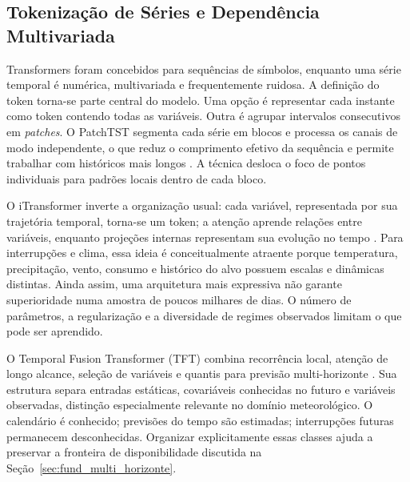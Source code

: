 \subsection{Tokenização de Séries e Dependência Multivariada}

Transformers foram concebidos para sequências de símbolos, enquanto uma série temporal é numérica, multivariada e frequentemente ruidosa. A definição do token torna-se parte central do modelo. Uma opção é representar cada instante como token contendo todas as variáveis. Outra é agrupar intervalos consecutivos em \textit{patches}. O PatchTST segmenta cada série em blocos e processa os canais de modo independente, o que reduz o comprimento efetivo da sequência e permite trabalhar com históricos mais longos \cite{nie2023patchtst}. A técnica desloca o foco de pontos individuais para padrões locais dentro de cada bloco.

O iTransformer inverte a organização usual: cada variável, representada por sua trajetória temporal, torna-se um token; a atenção aprende relações entre variáveis, enquanto projeções internas representam sua evolução no tempo \cite{liu2024itransformer}. Para interrupções e clima, essa ideia é conceitualmente atraente porque temperatura, precipitação, vento, consumo e histórico do alvo possuem escalas e dinâmicas distintas. Ainda assim, uma arquitetura mais expressiva não garante superioridade numa amostra de poucos milhares de dias. O número de parâmetros, a regularização e a diversidade de regimes observados limitam o que pode ser aprendido.

O Temporal Fusion Transformer (TFT) combina recorrência local, atenção de longo alcance, seleção de variáveis e quantis para previsão multi-horizonte \cite{lim2021temporal}. Sua estrutura separa entradas estáticas, covariáveis conhecidas no futuro e variáveis observadas, distinção especialmente relevante no domínio meteorológico. O calendário é conhecido; previsões do tempo são estimadas; interrupções futuras permanecem desconhecidas. Organizar explicitamente essas classes ajuda a preservar a fronteira de disponibilidade discutida na Seção~\ref{sec:fund_multi_horizonte}.

